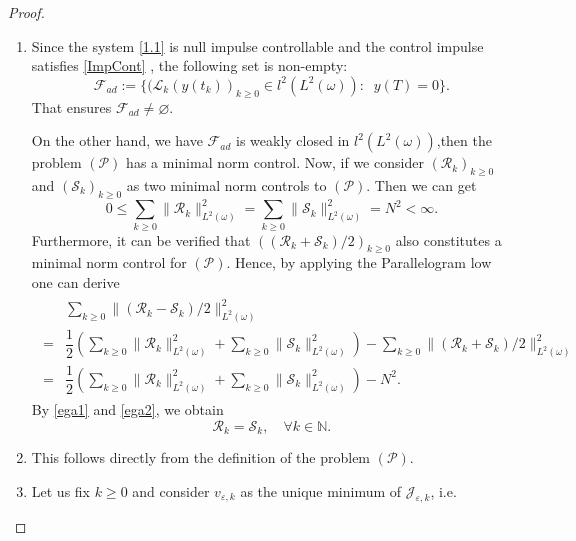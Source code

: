 \documentclass[10pt,a4paper]{amsart}
\begin{document}
\begin{proof}
    \begin{enumerate}
    \item[i)] Since the system \eqref{1.1} is null impulse controllable and the control impulse satisfies \eqref{ImpCont} , the following set is non-empty:
        \begin{equation*}
            \mathcal{F}_{ad}:=\lbrace (\mathcal{L}_{k}(y(t_k))_{k\geq 0}\in l^2(L^2(\omega)): \;\;y(T)=0 \rbrace.
        \end{equation*}
That ensures  $\mathcal{F}_{ad} \neq \varnothing$.

    On the other hand, we have $\mathcal{F}_{ad}$ is weakly closed in $l^2(L^2(\omega))$,then the problem $(\mathcal{P})$ has a minimal norm control. Now, if we consider  $(\mathcal{R}_k)_{k\geq 0}$ and $(\mathcal{S}_k)_{k\geq 0}$ as two minimal norm controls to $(\mathcal{P})$. Then we can get
    \begin{equation}\label{ega1}
    0\leq \sum\limits_{k\geq 0}\| \mathcal{R}_{k} \|_{L^2(\omega)}^2=\sum\limits_{k\geq 0}\| \mathcal{S}_{k} \|_{L^2(\omega)}^2=N^2<\infty. 
    \end{equation} 
    Furthermore, it can be verified that $\left((\mathcal{R}_k+\mathcal{S}_k)/2\right)_{k\geq 0}$ also constitutes a minimal norm control for $(\mathcal{P})$. Hence, by applying the Parallelogram low one can derive
    \begin{align}\label{ega2}
    \begin{split}
    &\sum\limits_{k\geq 0}\| (\mathcal{R}_k-\mathcal{S}_k)/2 \|_{L^2(\omega)}^2\\
    = &\dfrac{1}{2}\left( \sum\limits_{k\geq 0}\| \mathcal{R}_{k} \|_{L^2(\omega)}^2+\sum\limits_{k\geq 0}\| \mathcal{S}_{k} \|_{L^2(\omega)}^2\right) - \sum\limits_{k\geq 0}\| (\mathcal{R}_k+\mathcal{S}_k)/2 \|_{L^2(\omega)}^2\\
    = &\dfrac{1}{2}\left( \sum\limits_{k\geq 0}\| \mathcal{R}_{k} \|_{L^2(\omega)}^2+\sum\limits_{k\geq 0}\| \mathcal{S}_{k} \|_{L^2(\omega)}^2\right) - N^2.
     \end{split}
     \end{align} 
    By \eqref{ega1} and \eqref{ega2}, we obtain 
    \[ \mathcal{R}_k=\mathcal{S}_k, \quad \forall k\in \mathbb{N}. \]
    \item[ii)] This follows directly from the definition of the problem \((\mathcal{P})\).
    \item[iii)] Let us fix $k\geq 0$ and consider $v_{\varepsilon,k}$ as the unique minimum of $\mathcal{J}_{\varepsilon,k}$, i.e. 

\end{enumerate}
\end{proof}
\end{document}
